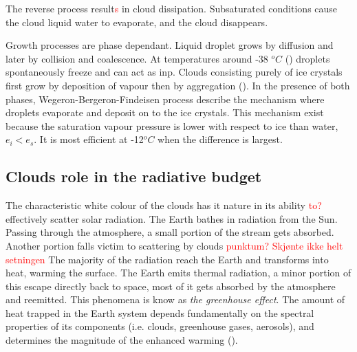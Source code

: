 The reverse process result\textcolor{red}{s} in cloud dissipation. Subsaturated conditions cause the cloud liquid water to evaporate, and the cloud disappears. 

Growth processes are phase dependant. Liquid droplet grows by diffusion and later by collision and coalescence. At temperatures around -38 $^oC$ (\cite{lohmann2016}) droplets spontaneously freeze and can act as \acrshort{inp}. Clouds consisting purely of ice crystals first grow by deposition of vapour then by aggregation (\cite{Fowler1996LiquidAssumptions}). In the presence of both phases, Wegeron-Bergeron-Findeisen process describe the mechanism where droplets evaporate and deposit on to the ice crystals. %
This mechanism exist because the saturation vapour pressure is lower with respect to ice than water, $e_i < e_s$. It is most efficient at -12$^oC$ when the difference is largest.


\subsection{Clouds role in the radiative budget}
The characteristic white colour of the clouds has it nature in its ability \textcolor{red}{to?} effectively scatter solar radiation. %
The Earth bathes in radiation from the Sun. Passing through the atmosphere, a small portion of the stream gets absorbed. Another portion falls victim to scattering by clouds \textcolor{red}{punktum? Skjønte ikke helt setningen}%
The majority of the radiation reach the Earth and transforms into heat, warming the surface. The Earth emits thermal radiation, a minor portion of this escape directly back to space, most of it gets absorbed by the atmosphere and reemitted. This phenomena is know as \textit{the greenhouse effect}. The amount of heat trapped in the Earth system depends fundamentally on the spectral properties of its components (i.e. clouds, greenhouse gases, aerosols), and determines the magnitude of the enhanced warming (\cite{greenhouse_effect}).

